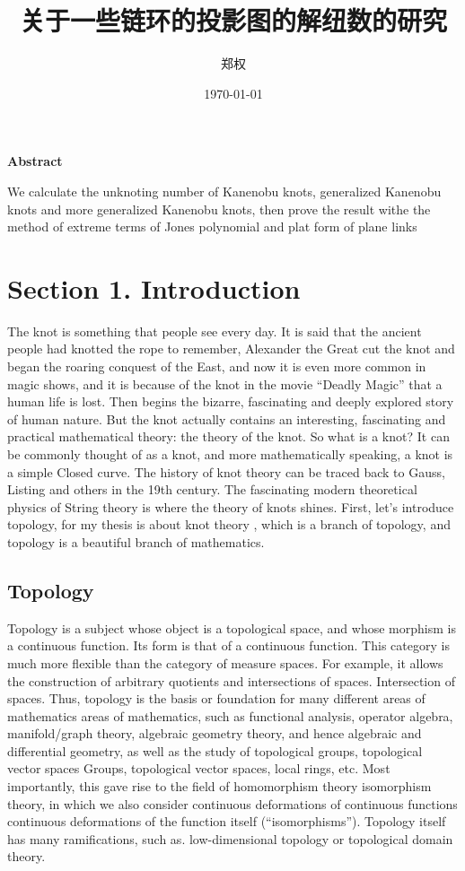 \documentclass[a4paper]{article}
\author{郑权}
\date{\today}
\title{关于一些链环的投影图的解纽数的研究}
\begin{document}
\maketitle
\tableofcontents

\begin{ABSTRACT}
\textbf{Abstract}

We calculate the unknoting number of Kanenobu knots, generalized Kanenobu knots and
more generalized Kanenobu knots, then prove the result withe the method of extreme terms of
Jones polynomial and plat form of plane links
\end{ABSTRACT}
\tableofcontents
\section{Section 1. Introduction}
\label{sec:orga3d8449}
The knot is something that people see every day. It is said that the ancient people had knotted the rope to remember, Alexander the Great cut the knot and began the roaring
conquest of the East, and now it is even more common in magic shows, and it is because of the knot in the movie ``Deadly Magic'' that a human life is lost.
Then begins the bizarre, fascinating and deeply explored story of human nature.
But the knot actually contains an interesting, fascinating and practical mathematical theory: the theory of the knot.
So what is a knot? It can be commonly thought of as a knot, and more mathematically speaking, a knot is a simple
Closed curve. The history of knot theory can be traced back to Gauss, Listing and others in the 19th century. The fascinating modern theoretical physics of
String theory is where the theory of knots shines.
First, let's introduce topology, for my thesis is about knot theory , which is a  branch of topology, and topology is a beautiful branch of mathematics.
\subsection{Topology}
\label{sec:org74f135a}
Topology is a subject whose object is a topological space, and whose morphism is a continuous function.
Its form is that of a continuous function. This category is much more flexible than the category of measure spaces.
For example, it allows the construction of arbitrary quotients and intersections of spaces.
Intersection of spaces. Thus, topology is the basis or foundation for many different areas of mathematics
areas of mathematics, such as functional analysis, operator algebra, manifold/graph theory, algebraic geometry
theory, and hence algebraic and differential geometry, as well as the study of topological groups, topological vector spaces
Groups, topological vector spaces, local rings, etc. Most importantly, this gave rise to the field of homomorphism theory
isomorphism theory, in which we also consider continuous deformations of continuous functions
continuous deformations of the function itself (``isomorphisms''). Topology itself has many ramifications, such as.
low-dimensional topology or topological domain theory.
\end{document}
